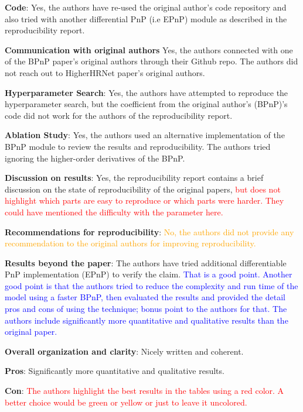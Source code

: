 \documentclass{article}
\begin{document}
\textbf{Code}: Yes, the authors have re-used the original author's code repository and also tried with another differential PnP (i.e EPnP) module as described in the reproducibility report.

\textbf{Communication with original authors} Yes, the authors connected with one of the BPnP paper's original authors through their Github repo. The authors did not reach out to HigherHRNet paper's original authors.

\textbf{Hyperparameter Search}: Yes, the authors have attempted to reproduce the hyperparameter search, but the  coefficient from the original author's (BPnP)'s code did not work for the authors of the reproducibility report.

\textbf{Ablation Study}: Yes, the authors used an alternative implementation of the BPnP module to review the results and reproducibility. The authors tried ignoring the higher-order derivatives of the BPnP.

\textbf{Discussion on results}: Yes, the reproducibility report contains a brief discussion on the state of reproducibility of the original papers, \textcolor{red}{but does not highlight which parts are easy to reproduce or which parts were harder. They could have mentioned the difficulty with the  parameter here.}

\textbf{Recommendations for reproducibility}: \textcolor{orange}{No, the authors did not provide any recommendation to the original authors for improving reproducibility.}

\textbf{Results beyond the paper}: The authors have tried additional differentiable PnP implementation (EPnP) to verify the claim. 
\textcolor{blue}{That is a good point.}
\textcolor{blue}{Another good point is that the authors tried to reduce the complexity and run time of the model using a faster BPnP, then evaluated the results and provided the detail pros and cons of using the technique; bonus point to the authors for that.} 
\textcolor{blue}{The authors include significantly more quantitative and qualitative results than the original paper.}

\textbf{Overall organization and clarity}: Nicely written and coherent.

\textbf{Pros}: Significantly more quantitative and qualitative results.

\textbf{Con}: \textcolor{red}{The authors highlight the best results in the tables using a red color. A better choice would be green or yellow or just to leave it uncolored.}
\end{document}
